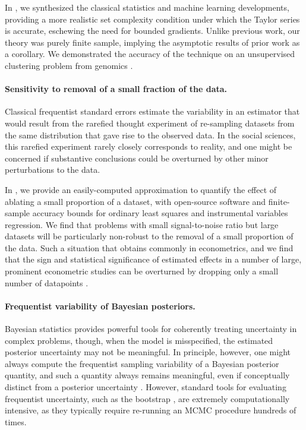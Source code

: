In \citet{giordano:2019:ij}, we synthesized the classical statistics and machine
learning developments, providing a more realistic set complexity condition under
which the Taylor series is accurate, eschewing the need for bounded gradients.
Unlike previous work, our theory was purely finite sample, implying the
asymptotic results of prior work as a corollary.  We demonstrated the accuracy
of the technique on an unsupervised clustering problem from genomics
\citep{shoemaker:2015:ultrasensitive}.


\paragraph{Sensitivity to removal of a small fraction of the data.} Classical
frequentist standard errors estimate the variability in an estimator that would
result from the rarefied thought experiment of re-sampling datasets from the same
distribution that gave rise to the observed data.  In the social sciences, this
rarefied experiment rarely closely corresponds to reality, and one might be
concerned if substantive conclusions could be overturned by other minor
perturbations to the data.

In \citet{giordano:2020:amip}, we provide an easily-computed approximation to
quantify the effect of ablating a small proportion of a dataset, with
open-source software and finite-sample accuracy bounds for ordinary least
squares and instrumental variables regression. We find that problems with small
signal-to-noise ratio but large datasets will be particularly non-robust to the
removal of a small proportion of the data. Such a situation that obtains
commonly in econometrics, and we find that the sign and statistical significance
of estimated effects in a number of large, prominent econometric studies can be
overturned by dropping only a small number of datapoints
\citep{angelucci:2009:indirect, finkelstein:2012:oregon, meager:2019:microcredit}.


\paragraph{Frequentist variability of Bayesian posteriors.}

Bayesian statistics provides powerful tools for coherently treating uncertainty
in complex problems, though, when the model is misspecified, the estimated
posterior uncertainty may not be meaningful.  In principle, however, one might
always compute the frequentist sampling variability of a Bayesian posterior
quantity, and such a quantity always remains meaningful, even if conceptually
distinct from a posterior uncertainty \citep{waddell:2002:bayesphyloboot,
kleijn:2006:misspecification}.  However, standard tools for evaluating
frequentist uncertainty, such as the bootstrap \citep{huggins:2019:bayesbag},
are extremely computationally intensive, as they typically require re-running an
MCMC procedure hundreds of times.

